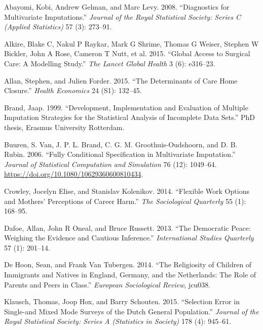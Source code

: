\documentclass[
]{article}
\newlength{\cslhangindent}
\newlength{\cslentryspacingunit} %
\newenvironment{CSLReferences}[2] %
 {%
  \setlength{\parindent}{0pt}
  \ifodd #1
  \let\oldpar\par
  \def\par{\hangindent=\cslhangindent\oldpar}
  \fi
  \setlength{\parskip}{#2\cslentryspacingunit}
 }%
 {}
\begin{document}
\hypertarget{refs}{}
\begin{CSLReferences}{1}{0}
\leavevmode{}%
Abayomi, Kobi, Andrew Gelman, and Marc Levy. 2008. {``Diagnostics for
Multivariate Imputations.''} \emph{Journal of the Royal Statistical
Society: Series C (Applied Statistics)} 57 (3): 273--91.

\leavevmode{}%
Alkire, Blake C, Nakul P Raykar, Mark G Shrime, Thomas G Weiser, Stephen
W Bickler, John A Rose, Cameron T Nutt, et al. 2015. {``Global Access to
Surgical Care: A Modelling Study.''} \emph{The Lancet Global Health} 3
(6): e316--23.

\leavevmode{}%
Allan, Stephen, and Julien Forder. 2015. {``The Determinants of Care
Home Closure.''} \emph{Health Economics} 24 (S1): 132--45.

\leavevmode{}%
Brand, Jaap. 1999. {``Development, Implementation and Evaluation of
Multiple Imputation Strategies for the Statistical Analysis of
Incomplete Data Sets.''} PhD thesis, Erasmus University Rotterdam.

\leavevmode{}%
Buuren, S. Van, J. P. L. Brand, C. G. M. Groothuis-Oudshoorn, and D. B.
Rubin. 2006. {``Fully Conditional Specification in Multivariate
Imputation.''} \emph{Journal of Statistical Computation and Simulation}
76 (12): 1049--64. \url{https://doi.org/10.1080/10629360600810434}.

\leavevmode{}%
Crowley, Jocelyn Elise, and Stanislav Kolenikov. 2014. {``Flexible Work
Options and Mothers' Perceptions of Career Harm.''} \emph{The
Sociological Quarterly} 55 (1): 168--95.

\leavevmode{}%
Dafoe, Allan, John R Oneal, and Bruce Russett. 2013. {``The Democratic
Peace: {Weighing} the Evidence and Cautious Inference.''}
\emph{International Studies Quarterly} 57 (1): 201--14.

\leavevmode{}%
De Hoon, Sean, and Frank Van Tubergen. 2014. {``The Religiosity of
Children of Immigrants and Natives in England, Germany, and the
Netherlands: {The} Role of Parents and Peers in Class.''} \emph{European
Sociological Review}, jcu038.

\leavevmode{}%
Klausch, Thomas, Joop Hox, and Barry Schouten. 2015. {``Selection Error
in Single-and Mixed Mode Surveys of the {Dutch} General Population.''}
\emph{Journal of the Royal Statistical Society: Series A (Statistics in
Society)} 178 (4): 945--61.


\end{CSLReferences}
\end{document}

